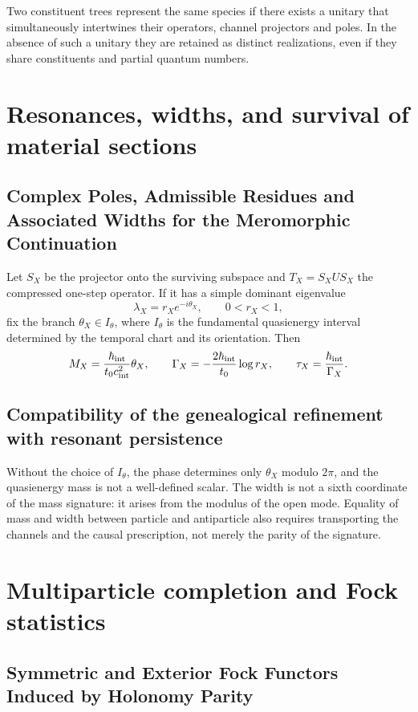 Two constituent trees represent the same species if there exists a
unitary that simultaneously intertwines their operators, channel projectors and
poles. In the absence of such a unitary they are retained as distinct realizations,
even if they share constituents and partial quantum numbers.

\section{Resonances, widths, and survival of material sections}

\subsection{Complex Poles, Admissible Residues and Associated Widths for the Meromorphic Continuation}

Let \(S_X\) be the projector onto the surviving subspace and
\(T_X=S_X U S_X\) the compressed one-step operator. If it has a simple dominant
eigenvalue
\[
 \lambda_X=r_X e^{-i\theta_X},\qquad 0<r_X<1,
\]
fix the branch \(\theta_X\in I_\theta\), where \(I_\theta\) is the fundamental
quasienergy interval determined by the temporal chart and its orientation.
Then
\[
 M_X=\frac{\hbar_{\rm int}}{t_0c_{\rm int}^2}\theta_X,
 \qquad
 \Gamma_X=-\frac{2\hbar_{\rm int}}{t_0}\log r_X,
 \qquad
 \tau_X=\frac{\hbar_{\rm int}}{\Gamma_X}.
\]
\subsection{Compatibility of the genealogical refinement with resonant persistence}

Without the choice of \(I_\theta\), the phase determines only \(\theta_X\) modulo
\(2\pi\), and the quasienergy mass is not a well-defined scalar.
The width is not a sixth coordinate of the mass signature: it arises from the modulus
of the open mode. Equality of mass and width between particle and
antiparticle also requires transporting the channels and the causal prescription, not merely
the parity of the signature.

\section{Multiparticle completion and Fock statistics}

\subsection{Symmetric and Exterior Fock Functors Induced by Holonomy Parity}


